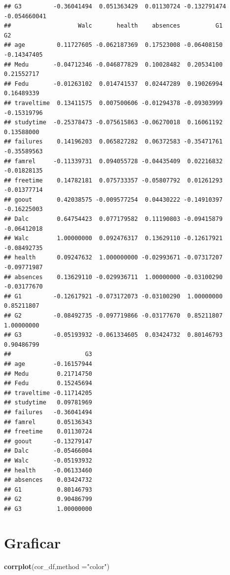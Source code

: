 \documentclass[
]{article}
\newenvironment{Shaded}{\begin{snugshade}}{\end{snugshade}}
\newcommand{\DataTypeTok}[1]{\textcolor[rgb]{0.13,0.29,0.53}{#1}}
\newcommand{\KeywordTok}[1]{\textcolor[rgb]{0.13,0.29,0.53}{\textbf{#1}}}
\newcommand{\NormalTok}[1]{#1}
\newcommand{\StringTok}[1]{\textcolor[rgb]{0.31,0.60,0.02}{#1}}
\begin{document}
\begin{verbatim}
## G3         -0.36041494  0.051363429  0.01130724 -0.132791474 -0.054660041
##                   Walc       health    absences          G1          G2
## age         0.11727605 -0.062187369  0.17523008 -0.06408150 -0.14347405
## Medu       -0.04712346 -0.046877829  0.10028482  0.20534100  0.21552717
## Fedu       -0.01263102  0.014741537  0.02447289  0.19026994  0.16489339
## traveltime  0.13411575  0.007500606 -0.01294378 -0.09303999 -0.15319796
## studytime  -0.25378473 -0.075615863 -0.06270018  0.16061192  0.13588000
## failures    0.14196203  0.065827282  0.06372583 -0.35471761 -0.35589563
## famrel     -0.11339731  0.094055728 -0.04435409  0.02216832 -0.01828135
## freetime    0.14782181  0.075733357 -0.05807792  0.01261293 -0.01377714
## goout       0.42038575 -0.009577254  0.04430222 -0.14910397 -0.16225003
## Dalc        0.64754423  0.077179582  0.11190803 -0.09415879 -0.06412018
## Walc        1.00000000  0.092476317  0.13629110 -0.12617921 -0.08492735
## health      0.09247632  1.000000000 -0.02993671 -0.07317207 -0.09771987
## absences    0.13629110 -0.029936711  1.00000000 -0.03100290 -0.03177670
## G1         -0.12617921 -0.073172073 -0.03100290  1.00000000  0.85211807
## G2         -0.08492735 -0.097719866 -0.03177670  0.85211807  1.00000000
## G3         -0.05193932 -0.061334605  0.03424732  0.80146793  0.90486799
##                     G3
## age        -0.16157944
## Medu        0.21714750
## Fedu        0.15245694
## traveltime -0.11714205
## studytime   0.09781969
## failures   -0.36041494
## famrel      0.05136343
## freetime    0.01130724
## goout      -0.13279147
## Dalc       -0.05466004
## Walc       -0.05193932
## health     -0.06133460
## absences    0.03424732
## G1          0.80146793
## G2          0.90486799
## G3          1.00000000
\end{verbatim}

\hypertarget{graficar}{%
\section{Graficar}\label{graficar}}

\begin{Shaded}
\begin{Highlighting}[]
\KeywordTok{corrplot}\NormalTok{(cor_df,}\DataTypeTok{method =}\StringTok{"color"}\NormalTok{)}
\end{Highlighting}
\end{Shaded}
\end{document}
